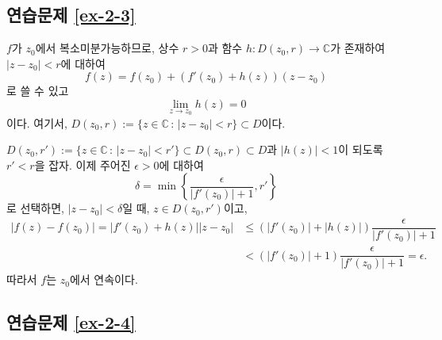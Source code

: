 \subsection*{연습문제 \ref{ex-2-3}}

$f$가 $z_0$에서 복소미분가능하므로,
상수 $r>0$과 함수 $h:D(z_0,r)\to \mathbb C$가 존재하여
$|z-z_0|<r$에 대하여
\[
f(z) = f(z_0) + (f'(z_0) + h(z))(z-z_0)
\]
로 쓸 수 있고
\[
\lim_{z\to z_0} h(z) = 0
\]
이다.
여기서, $D(z_0,r):= \{ z\in \mathbb C \,:\, |z-z_0| < r\} \subset D$이다.

$D(z_0,r'):= \{ z\in \mathbb C \,:\, |z-z_0| < r'\} \subset D(z_0,r) \subset D$과
$|h(z)|<1$이 되도록 $r'<r$을 잡자.
이제 주어진 $\epsilon>0$에 대하여
\[
\delta = \min\left\{ \dfrac\epsilon{|f'(z_0)|+1}, r' \right\}
\]
로 선택하면, $|z-z_0|<\delta$일 때, 
$z\in D(z_0, r')$이고,
\begin{align*}
|f(z) - f(z_0)| = |f'(z_0) + h(z)||z-z_0|
&\le ( |f'(z_0)|+|h(z)|)\dfrac{\epsilon}{ |f'(z_0)|+1} \\
&< ( |f'(z_0)|+1)  \dfrac{\epsilon}{|f'(z_0)|+1} = \epsilon.
\end{align*}
따라서 $f$는 $z_0$에서 연속이다.

\subsection*{연습문제 \ref{ex-2-4}}

